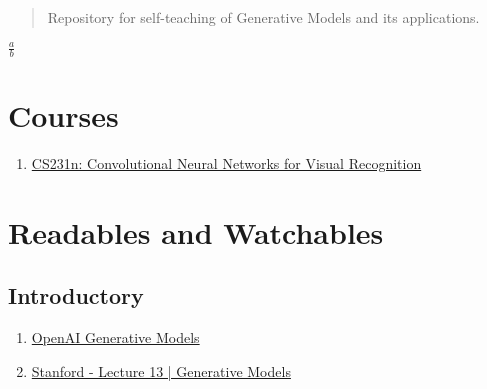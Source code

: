 \documentclass[12pt]{article}
\begin{document}
\maketitle
\tableofcontents

\begin{abstract}
  Repository for self-teaching of Generative Models and its applications.
\end{abstract}

$\frac{a}{b}$
\section{Courses}
\begin{enumerate}
  \item \href{http://cs231n.stanford.edu/}{CS231n: Convolutional Neural Networks for Visual Recognition}
\end{enumerate}

\section{Readables and Watchables}
\subsection{Introductory}
\begin{enumerate}
  \item \href{https://openai.com/blog/generative-models/}{OpenAI Generative Models}
  \item \href{https://www.youtube.com/watch?v=5WoItGTWV54}{Stanford - Lecture 13 | Generative Models}
\end{enumerate}
\end{document}
